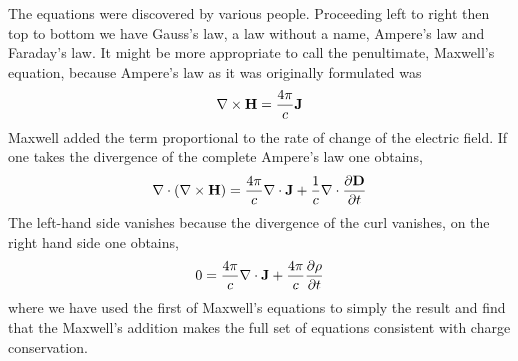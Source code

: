 The equations were discovered by various people.  Proceeding left to
right then top to bottom we have Gauss's law, a law without a name,
Ampere's law and Faraday's law.  It might be more appropriate to call 
the penultimate, Maxwell's equation, because Ampere's law as it was
originally formulated was
\begin{equation}
{\bf \nabla} \times {\bf H} = \frac{4\pi}{c} {\bf J} 
\label{eq:129}
\end{equation}
Maxwell added the term proportional to the rate of change of the
electric field.  If one takes the divergence of the complete Ampere's
law one obtains,
\begin{equation}
{\bf \nabla} \cdot \left ( {\bf \nabla} \times {\bf H} \right ) = 
\frac{4\pi}{c} {\bf \nabla} \cdot {\bf J}  +
\frac{1}{c} {\bf \nabla} \cdot \frac{\partial {\bf D}}{\partial {t}}
\label{eq:130}
\end{equation}
The left-hand side vanishes because the divergence of the curl
vanishes, on the right hand side one obtains,
\begin{equation}
0 = \frac{4\pi}{c} {\bf \nabla} \cdot {\bf J}  +
\frac{4\pi}{c} \frac{\partial {\rho}}{\partial {t}}
\label{eq:131}
\end{equation}
where we have used the first of Maxwell's equations to simply the
result and find that the Maxwell's addition makes the full set of
equations consistent with charge conservation.

